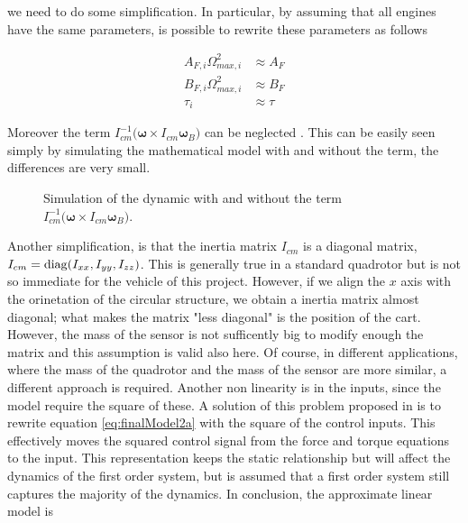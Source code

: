 \noindent we need to do some simplification. In particular, by assuming that all engines have the same parameters, is possible to rewrite these parameters as follows

\begin{align}
	A_{F,i}\Omega_{max,i}^2 &\approx A_F \\
	B_{F,i}\Omega_{max,i}^2 &\approx B_F \\
	\tau_i &\approx \tau
	\label{eq:simplification}
\end{align}

\noindent Moreover the term $I_{cm}^{-1}\bigl(\boldsymbol{\omega}\times I_{cm}\boldsymbol{\omega}_B\bigl)$ can be neglected \cite{modelIdentification}. This can be easily seen simply by simulating the mathematical model with and without the term, the differences are very small. 

\begin{figure}[h]
	\centering
	
	\caption{Simulation of the dynamic with and without the term $I_{cm}^{-1}\bigl(\boldsymbol{\omega}\times I_{cm}\boldsymbol{\omega}_B\bigl)$.}
	\label{fig:comparisonOmega}
\end{figure}

\noindent Another simplification, is that the inertia matrix $I_{cm}$ is a diagonal matrix, $I_{cm} = \operatorname*{diag}(\allowbreak I_{xx}, I_{yy}, I_{zz})$. This is generally true in a standard quadrotor but is not so immediate for the vehicle of this project. However, if we align the $x$ axis with the orinetation of the circular structure, we obtain a inertia matrix almost diagonal; what makes the matrix "less diagonal" is the position of the cart. However, the mass of the sensor is not sufficently big to modify enough the matrix and this assumption is valid also here. Of course, in different applications, where the mass of the quadrotor and the mass of the sensor are more similar, a different approach is required. Another non linearity is in the inputs, since the model require the square of these. A solution of this problem proposed in \cite{modelIdentification} is to rewrite equation \eqref{eq:finalModel2a} with the square of the control inputs. This effectively moves the squared control signal from the force and torque equations to the input. This representation keeps the static relationship but will affect the dynamics of the first order system, but is assumed that a first order system still captures the majority of the dynamics. In conclusion, the approximate linear model is

